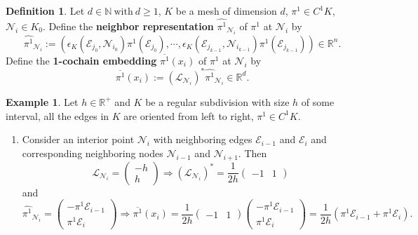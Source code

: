\documentclass[fleqn]{article}
\theoremstyle{definition}
\newtheorem{definition}[theorem]{Definition}
\newtheorem{example}[theorem]{Example}
\newcommand{\N}{\mathbb{N}}
\newcommand{\R}{\mathbb{R}}
\begin{document}
\begin{definition}
  Let $d \in \N\ \text{with}\ d \geq 1$, $K$ be a mesh of dimension $d$,
  $\pi^1 \in C^1 K$, $\mathcal{N}_i \in K_0$.
  Define the \textbf{neighbor representation} $\widehat{\pi^1}_{\mathcal{N}_i}$
  of $\pi^1$ at $\mathcal{N}_i$ by
  \begin{equation}
    \widehat{\pi^1}_{\mathcal{N}_i} :=
    ( \epsilon_K(\mathcal{E}_{j_0}, \mathcal{N}_{i_0}) \pi^1(\mathcal{E}_{j_0}),
      \cdots,
        \epsilon_K(\mathcal{E}_{j_{k - 1}}, \mathcal{N}_{i_{k - 1}})
        \pi^1(\mathcal{E}_{j_{k - 1}})
    ) \in \R^n.
  \end{equation}
  Define the \textbf{1-cochain embedding} $\overline{\pi^1}(x_i)$
  of $\pi^1$ at $\mathcal{N}_i$ by
  \begin{equation}
    \overline{\pi^1}(x_i) :=
    \left(\mathcal{L}_{\mathcal{N}_i}\right)^* \widehat{\pi^1}_{\mathcal{N}_i}
    \in \R^d.
  \end{equation}
\end{definition}

\begin{example}
  Let $h \in \R^+$ and $K$ be a regular subdivision with size $h$
  of some interval,
  all the edges in $K$ are oriented from left to right,
  $\pi^1 \in C^1 K$.
  \begin{enumerate}
    \item
      Consider an interior point $\mathcal{N}_i$ with neighboring edges
      $\mathcal{E}_{i - 1}$ and $\mathcal{E}_i$ and corresponding neighboring
      nodes $\mathcal{N}_{i - 1}$ and $\mathcal{N}_{i + 1}$.
      Then
      \begin{equation}
        \mathcal{L}_{\mathcal{N}_i} =
        \begin{pmatrix}
          -h \\
          h
        \end{pmatrix}
        \Rightarrow
        (\mathcal{L}_{\mathcal{N}_i})^* =
          \frac{1}{2 h}
          \begin{pmatrix}
            -1 & 1
          \end{pmatrix}
      \end{equation}
      and
      \begin{equation}
        \widehat{\pi^1}_{\mathcal{N}_i} =
        \begin{pmatrix}
          - \pi^1 \mathcal{E}_{i - 1} \\
          \pi^1 \mathcal{E}_i
        \end{pmatrix}
        \Rightarrow
        \overline{\pi^1}(x_i) =
          \frac{1}{2 h}
          \begin{pmatrix}
            -1 & 1
          \end{pmatrix}
          \begin{pmatrix}
            - \pi^1 \mathcal{E}_{i - 1} \\
            \pi^1 \mathcal{E}_i
          \end{pmatrix}
        = \frac{1}{2 h}
          \left(\pi^1 \mathcal{E}_{i - 1} + \pi^1 \mathcal{E}_i\right).
      \end{equation}
  \end{enumerate}
\end{example}
\end{document}
